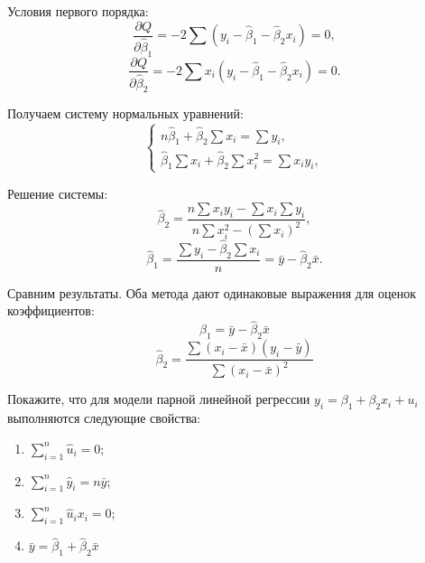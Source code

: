 \documentclass[12pt]{article}
\newcommand{\hb}{\hat{\beta}}
\newcommand{\hu}{\hat{u}}
\newcommand{\hy}{\hat{y}}
\begin{document}
\begin{sol}
\begin{enumerate}
Условия первого порядка:
\[
\frac{\partial Q}{\partial \hat{\beta}_1} = -2\sum (y_i - \hat{\beta}_1 - \hat{\beta}_2 x_i) = 0,
\]
\[
\frac{\partial Q}{\partial \hat{\beta}_2} = -2\sum x_i(y_i - \hat{\beta}_1 - \hat{\beta}_2 x_i) = 0.
\]

Получаем систему нормальных уравнений:
\[
\begin{cases}
n\hat{\beta}_1 + \hat{\beta}_2\sum x_i = \sum y_i, \\
\hat{\beta}_1\sum x_i + \hat{\beta}_2\sum x_i^2 = \sum x_i y_i,
\end{cases}
\]

Решение системы:
\[
\hat{\beta}_2 = \frac{n\sum x_i y_i - \sum x_i \sum y_i}{n\sum x_i^2 - (\sum x_i)^2},
\]
\[
\hat{\beta}_1 = \frac{\sum y_i - \hat{\beta}_2 \sum x_i}{n} = \bar{y} - \hat{\beta}_2 \bar{x}.
\]

Сравним результаты. 
Оба метода дают одинаковые выражения для оценок коэффициентов:
\[
\hat{\beta}_1 = \bar{y} - \hat{\beta}_2 \bar{x}
\]
\[
\hat{\beta}_2 = \frac{\sum (x_i - \bar{x})(y_i - \bar{y})}{\sum (x_i - \bar{x})^2}
\]
\end{enumerate}
\end{sol}

\begin{problem}
    Покажите, что для модели парной линейной регрессии  $y_i = \beta_1 + \beta_2 x_i + u_i$  выполняются следующие свойства:
    \label{task:2lin}
    \begin{enumerate}
        \item $\sum^n_{i=1} \hu_i = 0$;
        \item $\sum^n_{i=1} \hy_i = n \bar{y}$;
        \item $\sum^n_{i=1} \hu_i x_i = 0$;
        \item $\bar{y} = \hb_1 + \hb_2 \bar{x}$
    \end{enumerate}
\end{problem}
\end{document}
